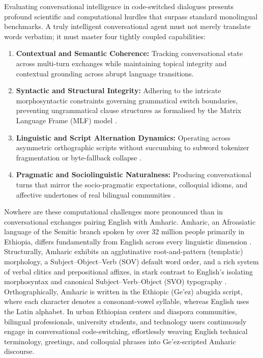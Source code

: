 \documentclass[11pt,a4paper]{article}
\begin{document}
Evaluating conversational intelligence in code-switched dialogues presents profound scientific and computational hurdles that surpass standard monolingual benchmarks. A truly intelligent conversational agent must not merely translate words verbatim; it must master four tightly coupled capabilities:
\begin{enumerate}
    \item \textbf{Contextual and Semantic Coherence:} Tracking conversational state across multi-turn exchanges while maintaining topical integrity and contextual grounding across abrupt language transitions.
    \item \textbf{Syntactic and Structural Integrity:} Adhering to the intricate morphosyntactic constraints governing grammatical switch boundaries, preventing ungrammatical clause structures as formalised by the Matrix Language Frame (MLF) model \cite{myersscotton1993duelling}.
    \item \textbf{Linguistic and Script Alternation Dynamics:} Operating across asymmetric orthographic scripts without succumbing to subword tokenizer fragmentation or byte-fallback collapse \cite{ahia2021tokenization}.
    \item \textbf{Pragmatic and Sociolinguistic Naturalness:} Producing conversational turns that mirror the socio-pragmatic expectations, colloquial idioms, and affective undertones of real bilingual communities \cite{grosjean2010bilingual}.
\end{enumerate}

Nowhere are these computational challenges more pronounced than in conversational exchanges pairing English with Amharic. Amharic, an Afroasiatic language of the Semitic branch spoken by over 32 million people primarily in Ethiopia, differs fundamentally from English across every linguistic dimension \cite{leyew1998amharic, yimam2021amharic}. Structurally, Amharic exhibits an agglutinative root-and-pattern (templatic) morphology, a Subject--Object--Verb (SOV) default word order, and a rich system of verbal clitics and prepositional affixes, in stark contrast to English's isolating morphosyntax and canonical Subject--Verb--Object (SVO) typography \cite{alebachew2024african, andersland2024amharic}. Orthographically, Amharic is written in the Ethiopic (Ge'ez) abugida script, where each character denotes a consonant-vowel syllable, whereas English uses the Latin alphabet. In urban Ethiopian centers and diaspora communities, bilingual professionals, university students, and technology users continuously engage in conversational code-switching, effortlessly weaving English technical terminology, greetings, and colloquial phrases into Ge'ez-scripted Amharic discourse.
\end{document}
